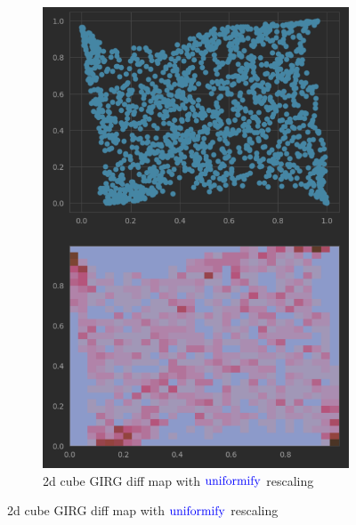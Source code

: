 \begin{figure}
\begin{subfigure}{0.45\textwidth}
      \includegraphics[width=\linewidth]{figures/diffmap_plot_uniformed.png}
      \caption{2d cube GIRG diff map with $\operatorname{\textcolor{blue}{uniformify}}$ rescaling}
      \label{fig:sub2}
    \end{subfigure}
  
    \vspace{1em}
  

\end{figure}
